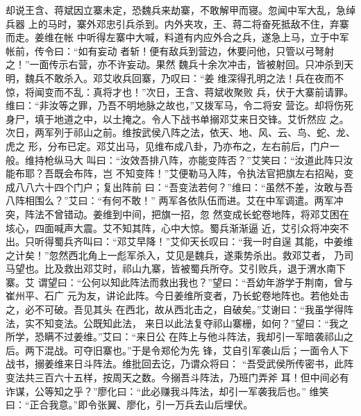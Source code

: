 却说王含、蒋斌因立寨未定，恐魏兵来劫寨，不敢解甲而寝。忽闻中军大乱，急绰兵器
上的马时，寨外邓忠引兵杀到。内外夹攻，王、蒋二将奋死抵敌不住，弃寨而走。姜维在帐
中听得左寨中大喊，料道有内应外合之兵，遂急上马，立于中军帐前，传令曰：“如有妄动
者斩！便有敌兵到营边，休要问他，只管以弓弩射之！”一面传示右营，亦不许妄动。果然
魏兵十余次冲击，皆被射回。只冲杀到天明，魏兵不敢杀入。邓艾收兵回寨，乃叹曰：“姜
维深得孔明之法！兵在夜而不惊，将闻变而不乱：真将才也！”次日，王含、蒋斌收聚败
兵，伏于大寨前请罪。维曰：“非汝等之罪，乃吾不明地脉之故也，”又拨军马，令二将安
营讫。却将伤死身尸，填于地道之中，以土掩之。令人下战书单搦邓艾来日交锋。艾忻然应
之。次日，两军列于祁山之前。维按武侯八阵之法，依天、地、风、云、鸟、蛇、龙、虎之
形，分布已定。邓艾出马，见维布成八卦，乃亦布之，左右前后，门户一般。维持枪纵马大
叫曰：“汝效吾排八阵，亦能变阵否？”艾笑曰：“汝道此阵只汝能布耶？吾既会布阵，岂
不知变阵！”艾便勒马入阵，令执法官把旗左右招飐，变成八八六十四个门户；复出阵前
曰：“吾变法若何？”维曰：“虽然不差，汝敢与吾八阵相围么？”艾曰：“有何不敢！”
两军各依队伍而进。艾在中军调遣。两军冲突，阵法不曾错动。姜维到中间，把旗一招，忽
然变成长蛇卷地阵，将邓艾困在垓心，四面喊声大震。艾不知其阵，心中大惊。蜀兵渐渐逼
近，艾引众将冲突不出。只听得蜀兵齐叫曰：“邓艾早降！”艾仰天长叹曰：“我一时自逞
其能，中姜维之计矣！”忽然西北角上一彪军杀入，艾见是魏兵，遂乘势杀出。救邓艾者，
乃司马望也。比及救出邓艾时，祁山九寨，皆被蜀兵所夺。艾引败兵，退于渭水南下寨。艾
谓望曰：“公何以知此阵法而救出我也？”望曰：“吾幼年游学于荆南，曾与崔州平、石广
元为友，讲论此阵。今日姜维所变者，乃长蛇卷地阵也。若他处击之，必不可破。吾见其头
在西北，故从西北击之，自破矣。”艾谢曰：“我虽学得阵法，实不知变法。公既知此法，
来日以此法复夺祁山寨栅，如何？”望曰：“我之所学，恐瞒不过姜维。”艾曰：“来日公
在阵上与他斗阵法，我却引一军暗袭祁山之后。两下混战。可夺旧寨也。”于是令郑伦为先
锋，艾自引军袭山后；一面令人下战书，搦姜维来日斗阵法。维批回去讫，乃谓众将曰：
“吾受武侯所传密书，此阵变法共三百六十五样，按周天之数。今搦吾斗阵法，乃班门弄斧
耳！但中间必有诈谋，公等知之乎？”廖化曰：“此必赚我斗阵法，却引一军袭我后也。”
维笑曰：“正合我意。”即令张翼、廖化，引一万兵去山后埋伏。

